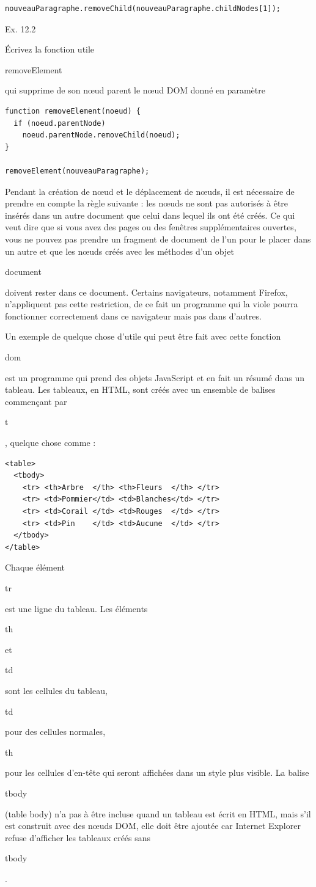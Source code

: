 \documentclass{FramateX}
\renewcommand{\texttt}[1]{\begin{sffamily}{#1}\end{sffamily}}
\begin{document}
\begin{lstlisting}
nouveauParagraphe.removeChild(nouveauParagraphe.childNodes[1]);
\end{lstlisting}
\begin{center}\end{center}

Ex. 12.2

Écrivez la fonction utile \texttt{removeElement} qui supprime de son
nœud parent le nœud DOM donné en paramètre

\begin{lstlisting}
function removeElement(noeud) {
  if (noeud.parentNode)
    noeud.parentNode.removeChild(noeud);
}

removeElement(nouveauParagraphe);
\end{lstlisting}
\begin{center}\end{center}

Pendant la création de nœud et le déplacement de nœuds, il est
nécessaire de prendre en compte la règle suivante : les nœuds ne sont
pas autorisés à être insérés dans un autre document que celui dans
lequel ils ont été créés. Ce qui veut dire que si vous avez des pages ou
des fenêtres supplémentaires ouvertes, vous ne pouvez pas prendre un
fragment de document de l'un pour le placer dans un autre et que les
nœuds créés avec les méthodes d'un objet \texttt{document} doivent
rester dans ce document. Certains navigateurs, notamment Firefox,
n'appliquent pas cette restriction, de ce fait un programme qui la viole
pourra fonctionner correctement dans ce navigateur mais pas dans
d'autres.

\begin{center}\end{center}

Un exemple de quelque chose d'utile qui peut être fait avec cette
fonction \texttt{dom} est un programme qui prend des objets JavaScript
et en fait un résumé dans un tableau. Les tableaux, en HTML, sont créés
avec un ensemble de balises commençant par \texttt{t}, quelque chose
comme :

\begin{lstlisting}
<table>
  <tbody>
    <tr> <th>Arbre  </th> <th>Fleurs  </th> </tr>
    <tr> <td>Pommier</td> <td>Blanches</td> </tr>
    <tr> <td>Corail </td> <td>Rouges  </td> </tr>
    <tr> <td>Pin    </td> <td>Aucune  </td> </tr>
  </tbody>
</table>
\end{lstlisting}
Chaque élément \texttt{tr} est une ligne du tableau. Les éléments
\texttt{th} et \texttt{td} sont les cellules du tableau, \texttt{td}
pour des cellules normales, \texttt{th} pour les cellules d'en-tête qui
seront affichées dans un style plus visible. La balise \texttt{tbody}
(table body) n'a pas à être incluse quand un tableau est écrit en HTML,
mais s'il est construit avec des nœuds DOM, elle doit être ajoutée car
Internet Explorer refuse d'afficher les tableaux créés sans
\texttt{tbody}.
\end{document}
